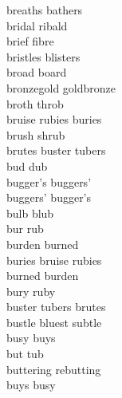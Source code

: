 breaths bathers\\
bridal ribald\\
brief fibre\\
bristles blisters\\
broad board\\
bronzegold goldbronze\\
broth throb\\
bruise rubies buries\\
brush shrub\\
brutes buster tubers\\
bud dub\\
bugger's buggers'\\
buggers' bugger's\\
bulb blub\\
bur rub\\
burden burned\\
buries bruise rubies\\
burned burden\\
bury ruby\\
buster tubers brutes\\
bustle bluest subtle\\
busy buys\\
but tub\\
buttering rebutting\\
buys busy\\

